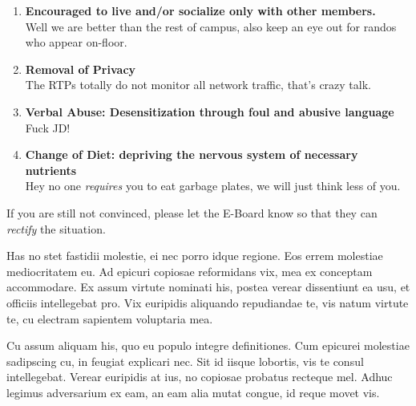 \documentclass[9pt]{extarticle} %
\begin{document}
\begin{minipage}[t]{.61\linewidth}
\begin{enumerate}
\item \textbf{Encouraged to live and/or socialize only with other members.} \\
Well we are better than the rest of campus, also keep an eye out for randos 
who appear on-floor. 

\item \textbf{Removal of Privacy} \\
The RTPs totally do not monitor all network traffic, that's crazy talk. 

\item \textbf{Verbal Abuse: Desensitization through foul and abusive language} \\
Fuck JD!

\item \textbf{Change of Diet: depriving the nervous system of necessary 
nutrients} \\
Hey no one \textit{requires} you to eat garbage plates, we will just think less
of you.


\end{enumerate}

If you are still not convinced, please let the E-Board know so that they can
\textit{rectify} the situation. 


\hypertarget{secondnews}{} 

Has no stet fastidii molestie, ei nec porro idque regione. Eos errem molestiae mediocritatem eu. Ad epicuri copiosae reformidans vix, mea ex conceptam accommodare. Ex assum virtute nominati his, postea verear dissentiunt ea usu, et officiis intellegebat pro. Vix euripidis aliquando repudiandae te, vis natum virtute te, cu electram sapientem voluptaria mea.

Cu assum aliquam his, quo eu populo integre definitiones. Cum epicurei molestiae sadipscing cu, in feugiat explicari nec. Sit id iisque lobortis, vis te consul intellegebat. Verear euripidis at ius, no copiosae probatus recteque mel. Adhuc legimus adversarium ex eam, an eam alia mutat congue, id reque movet vis.


\end{minipage} %
\end{document}
